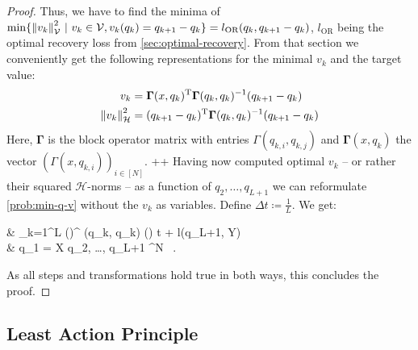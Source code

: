 \begin{proof}
	Thus, we have to find the minima of $\min\{\norm{v_k}_\mathcal{V}^2~|~ v_k \in \mathcal{V}, v_k(q_k) = q_{k+1} - q_k\} = l_{\text{OR}}(q_k, q_{k+1} - q_k)$, $l_{\text{OR}}$ being the optimal recovery loss from \cref{sec:optimal-recovery}.
	From that section we conveniently get the following representations for the minimal $v_k$ and the target value:
	\begin{align}
		v_k & = \mathbf{\Gamma}(x, q_k)^\mathrm{T}\mathbf{\Gamma}(q_k, q_k)^{-1} (q_{k+1} - q_k)\\
		\norm{v_k}_\mathcal{H}^2 &= (q_{k+1} - q_k)^\mathrm{T} \mathbf{\Gamma}(q_k, q_k)^{-1} (q_{k+1} - q_k)
	\end{align}
	Here, $\mathbf{\Gamma}$ is the block operator matrix with entries $\Gamma(q_{k,i}, q_{k, j})$ and $\mathbf{\Gamma}(x, q_k)$ the vector $(\Gamma(x, q_{k, i}))_{i \in [N]}$.
	++
	Having now computed optimal $v_k$ -- or rather their squared $\mathcal{H}$-norms -- as a function of $q_2, \ldots, q_{L+1}$ we can reformulate \cref{prob:min-q-v} without the $v_k$ as variables.
	Define $\Delta t \coloneqq \frac{1}{L}$.
	We get:
	\begin{problem}
		\begin{cases}
			 & \nu \cdot {} \sum_{k=1}^{L}  
			\left(\right)^ \mathbf{\Gamma}(q_k, q_k)
			\left(\right) \cdot \Delta t
			+ l(q_{L+1}, Y) \\
			 & q_1 = X  q_2, \ldots, q_{L+1} \in \cX^N \ .
		\end{cases}
	\end{problem}
	As all steps and transformations hold true in both ways, this concludes the proof.
\end{proof}

\subsection{Least Action Principle}

